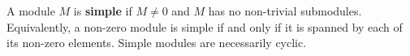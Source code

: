 A module $M$ is \textbf{simple} if $M \neq 0$ and $M$ has no non-trivial submodules. Equivalently, a non-zero module is simple if and only if it is spanned by each of its non-zero elements. Simple modules are necessarily cyclic.
